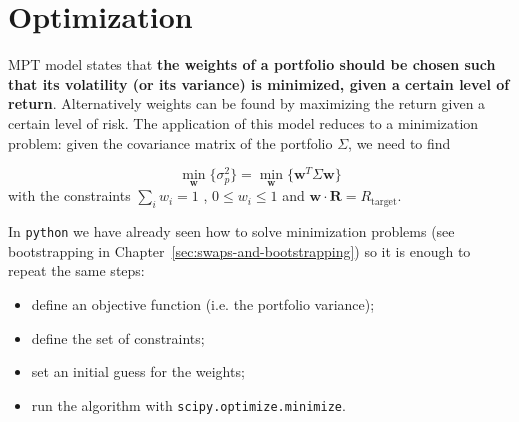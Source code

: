 %
%

\section{Optimization}\label{optimization}

MPT model states that \textbf{the weights of a portfolio should be chosen such that its volatility (or its variance) is minimized, given a certain level of return}. Alternatively weights can be found by maximizing the return given a certain level of risk. 
The application of this model reduces to a minimization problem: given the covariance matrix of the portfolio $\Sigma$, we need to find

\begin{equation}
\underset{\mathbf{w}}{\min}\{\sigma_p^2\} = \underset{\mathbf{w}}{\min}\{\mathbf{w}^T\Sigma\mathbf{w}\}
\end{equation}
with the constraints $\sum_{i}w_i = 1$ , $0 \le w_i \le 1$ and $\mathbf{w}\cdot\mathbf{R}=R_{\textrm{target}}$.

In \texttt{python} we have already seen how to solve minimization problems (see bootstrapping in Chapter~\ref{sec:swaps-and-bootstrapping}) so it is enough to repeat the same steps:

\begin{itemize}
\tightlist
\item define an objective function (i.e. the portfolio variance);
\item define the set of constraints;
\item set an initial guess for the weights;
\item run the algorithm with \texttt{scipy.optimize.minimize}.
\end{itemize}


